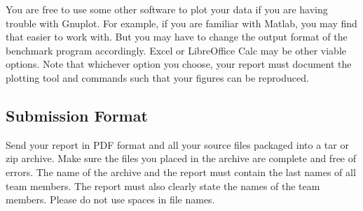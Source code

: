 \documentclass[a4paper,10pt]{article}
\begin{document}
You are free to use some other software to plot your data if you are having trouble with Gnuplot.
For example, if you are familiar with Matlab, you may find that easier to work with.
But you may have to change the output format of the benchmark program accordingly.
Excel or LibreOffice Calc may be other viable options.
Note that whichever option you choose, your report must document the plotting tool and commands such that your figures can be reproduced.

\subsection*{Submission Format}

Send your report in PDF format and all your source files packaged into a tar or zip archive.
Make sure the files you placed in the archive are complete and free of errors.
The name of the archive and the report must contain the last names of all team members.
The report must also clearly state the names of the team members.
Please do not use spaces in file names.



\footnotesize


\end{document}
